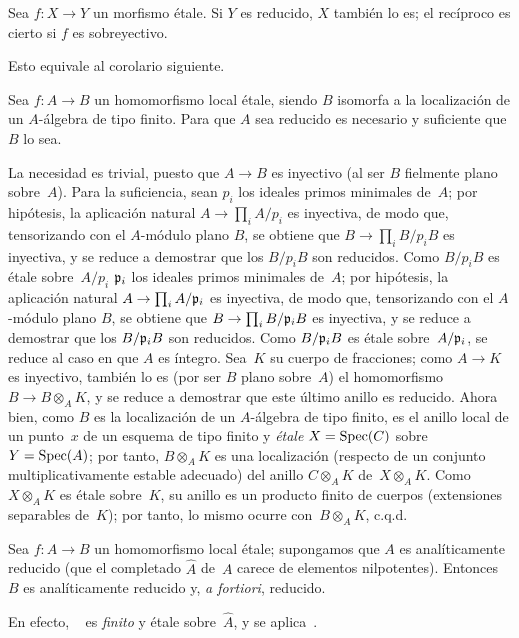 \setcounter{subsection}{1}
\setcounter{proposition}{1}

\begin{proposition}
\label{prop:I.9.2}
Sea $f\colon X\to Y$ un morfismo étale. Si $Y$ es reducido, $X$ también lo es; el recíproco es cierto si $f$ es sobreyectivo.
\end{proposition}

Esto equivale al corolario siguiente.
\begin{corollaire}
\label{I.9.3}
Sea $f\colon A\to B$ un homomorfismo local étale, siendo $B$ isomorfa a la localización de un $A$-álgebra de tipo finito.
Para que $A$ sea reducido es necesario y suficiente que $B$ lo sea.
\end{corollaire}

La necesidad es trivial, puesto que $A\to B$ es inyectivo (al ser $B$ fielmente plano sobre~$A$). Para la suficiencia, sean
{$p_i$ los ideales primos minimales de~$A$; por hipótesis, la aplicación natural $A\to\prod_iA/p_i$ es inyectiva, de modo que, tensorizando con el $A$-módulo plano $B$, se obtiene que $B\to\prod_iB/p_iB$ es inyectiva, y se reduce a demostrar que los $B/p_iB$ son reducidos. Como $B/p_iB$ es étale sobre~$A/p_i$}
{$\mathfrak{p}_i$ los ideales primos minimales de~$A$; por hipótesis, la aplicación natural $A\to\prod_iA/\mathfrak{p}_i$ es inyectiva, de modo que, tensorizando con el $A$-módulo plano $B$, se obtiene que $B\to\prod_iB/\mathfrak{p}_iB$ es inyectiva, y se reduce a demostrar que los $B/\mathfrak{p}_iB$ son reducidos. Como $B/\mathfrak{p}_iB$ es étale sobre~$A/\mathfrak{p}_i$},
se reduce al caso en que $A$ es íntegro. Sea~$K$ su cuerpo de fracciones; como $A\to K$ es inyectivo, también lo es (por ser $B$ plano sobre~$A$) el homomorfismo $B\to B\otimes_AK$, y se reduce a demostrar que este último anillo es reducido. Ahora bien, como $B$ es la localización de un $A$-álgebra de tipo finito, es el anillo local de un punto~$x$ de un esquema de tipo finito y \emph{étale} $X=\operatorname{Spec}(C)$ sobre~$Y=\operatorname{Spec}(A)$; por tanto, $B\otimes_AK$ es una localización (respecto de un conjunto multiplicativamente estable adecuado) del anillo $C\otimes_AK$ de~$X\otimes_AK$. Como $X\otimes_AK$ es étale sobre~$K$, su anillo es un producto finito de cuerpos (extensiones separables de~$K$); por tanto, lo mismo ocurre con~$B\otimes_AK$, c.q.d.

\begin{corollaire}
\label{I.9.4}
Sea $f\colon A\to B$ un homomorfismo local étale; supongamos que $A$ es analíticamente reducido
%
(\ie que el completado $\hat{A}$ de~$A$ carece de elementos nilpotentes). Entonces $B$ es analíticamente reducido y, \emph{a fortiori}, reducido.
\end{corollaire}

En efecto, \ %
es \emph{finito} y étale sobre~$\hat{A}$, y se aplica~.
